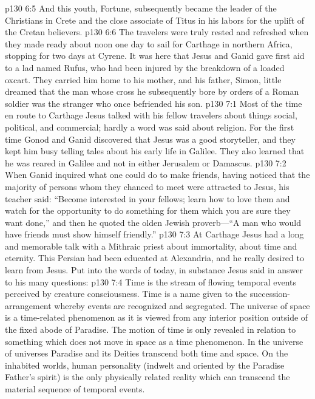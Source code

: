 \vs p130 6:5 And this youth, Fortune, subsequently became the leader of the Christians in Crete and the close associate of Titus in his labors for the uplift of the Cretan believers.
\pc \vs p130 6:6 The travelers were truly rested and refreshed when they made ready about noon one day to sail for Carthage in northern Africa, stopping for two days at Cyrene. It was here that Jesus and Ganid gave first aid to a lad named Rufus, who had been injured by the breakdown of a loaded oxcart. They carried him home to his mother, and his father, Simon, little dreamed that the man whose cross he subsequently bore by orders of a Roman soldier was the stranger who once befriended his son.
\vs p130 7:1 Most of the time en route to Carthage Jesus talked with his fellow travelers about things social, political, and commercial; hardly a word was said about religion. For the first time Gonod and Ganid discovered that Jesus was a good storyteller, and they kept him busy telling tales about his early life in Galilee. They also learned that he was reared in Galilee and not in either Jerusalem or Damascus.
\vs p130 7:2 When Ganid inquired what one could do to make friends, having noticed that the majority of persons whom they chanced to meet were attracted to Jesus, his teacher said: \textcolor{ubdarkred}{“Become interested in your fellows; learn how to love them and watch for the opportunity to do something for them which you are sure they want done,”} and then he quoted the olden Jewish proverb---\textcolor{ubdarkred}{“A man who would have friends must show himself friendly.”}
\vs p130 7:3 At Carthage Jesus had a long and memorable talk with a Mithraic priest about immortality, about time and eternity. This Persian had been educated at Alexandria, and he really desired to learn from Jesus. Put into the words of today, in substance Jesus said in answer to his many questions:
\pc \vs p130 7:4 Time is the stream of flowing temporal events perceived by creature consciousness. Time is a name given to the succession\hyp{}arrangement whereby events are recognized and segregated. The universe of space is a time\hyp{}related phenomenon as it is viewed from any interior position outside of the fixed abode of Paradise. The motion of time is only revealed in relation to something which does not move in space as a time phenomenon. In the universe of universes Paradise and its Deities transcend both time and space. On the inhabited worlds, human personality (indwelt and oriented by the Paradise Father’s spirit) is the only physically related reality which can transcend the material sequence of temporal events.
